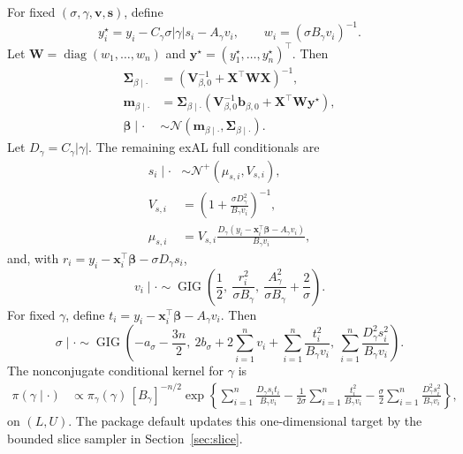 \documentclass[nojss,noheadings]{jss}
\newcommand{\diag}{\operatorname{diag}}
\newcommand{\vect}[1]{\bm{#1}}
\newcommand{\mat}[1]{\mathbf{#1}}
\newcommand{\N}{\mathcal{N}}
\newcommand{\TNp}{\mathcal{N}^{+}}
\newcommand{\GIG}{\operatorname{GIG}}
\newcommand{\pigamma}{\pi_\gamma}
\begin{document}
For fixed $(\sigma,\gamma,\vect{v},\vect{s})$, define
\begin{equation}
y_i^\star=y_i-C_\gamma\sigma|\gamma|s_i-A_\gamma v_i,\qquad
w_i=(\sigma B_\gamma v_i)^{-1}.
\end{equation}
Let $\mat{W}=\diag(w_1,\ldots,w_n)$ and
$\vect{y}^\star=(y_1^\star,\ldots,y_n^\star)^\top$. Then
\begin{align}
\mat{\Sigma}_{\beta\mid\cdot}
&=\left(\mat{V}_{\beta,0}^{-1}+\mat{X}^\top\mat{W}\mat{X}\right)^{-1},\\
\vect{m}_{\beta\mid\cdot}
&=\mat{\Sigma}_{\beta\mid\cdot}
\left(\mat{V}_{\beta,0}^{-1}\vect{b}_{\beta,0}+\mat{X}^\top\mat{W}\vect{y}^\star\right),\\
\vect{\beta}\mid\cdot
&\sim\N(\vect{m}_{\beta\mid\cdot},\mat{\Sigma}_{\beta\mid\cdot}).
\label{eq:static_beta_cond}
\end{align}
Let $D_\gamma=C_\gamma|\gamma|$. The remaining exAL full conditionals are
\begin{align}
s_i\mid\cdot
&\sim \TNp(\mu_{s,i},V_{s,i}),\\
V_{s,i}
&=\left(1+\frac{\sigma D_\gamma^2}{B_\gamma v_i}\right)^{-1},\\
\mu_{s,i}
&=V_{s,i}\frac{D_\gamma(y_i-\vect{x}_i^\top\vect{\beta}-A_\gamma v_i)}
{B_\gamma v_i},
\label{eq:static_exal_s_cond}
\end{align}
and, with $r_i=y_i-\vect{x}_i^\top\vect{\beta}-\sigma D_\gamma s_i$,
\begin{equation}
v_i\mid\cdot
\sim
\GIG\left(
\frac{1}{2},\
\frac{r_i^2}{\sigma B_\gamma},\
\frac{A_\gamma^2}{\sigma B_\gamma}+\frac{2}{\sigma}
\right).
\label{eq:static_exal_v_cond}
\end{equation}
For fixed $\gamma$, define $t_i=y_i-\vect{x}_i^\top\vect{\beta}-A_\gamma v_i$.
Then
\begin{equation}
\sigma\mid\cdot
\sim
\GIG\left(
-a_\sigma-\frac{3n}{2},\
2b_\sigma+2\sum_{i=1}^n v_i+\sum_{i=1}^n\frac{t_i^2}{B_\gamma v_i},\
\sum_{i=1}^n\frac{D_\gamma^2s_i^2}{B_\gamma v_i}
\right).
\label{eq:static_exal_sigma_cond}
\end{equation}
The nonconjugate conditional kernel for $\gamma$ is
\begin{align}
\pi(\gamma\mid\cdot)
&\propto
\pigamma(\gamma)\,[B_\gamma]^{-n/2}
\exp\left\{
\sum_{i=1}^n\frac{D_\gamma s_it_i}{B_\gamma v_i}
-\frac{1}{2\sigma}\sum_{i=1}^n\frac{t_i^2}{B_\gamma v_i}
-\frac{\sigma}{2}\sum_{i=1}^n\frac{D_\gamma^2s_i^2}{B_\gamma v_i}
\right\},
\label{eq:static_exal_gamma_cond}
\end{align}
on $(L,U)$. The package default updates this one-dimensional target by the
bounded slice sampler in Section~\ref{sec:slice}.
\end{document}
